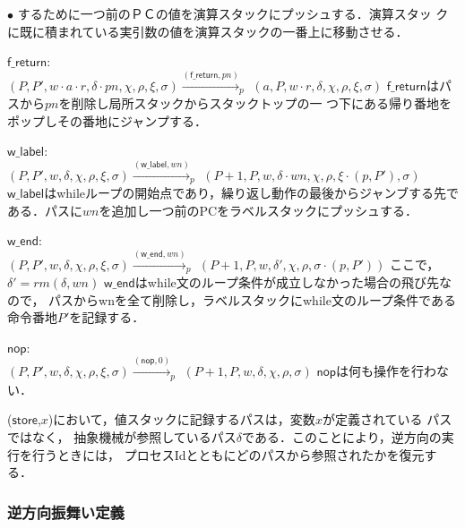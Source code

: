 \documentclass[submit,PRO]{ipsj}
\newcommand{\bcode}[1]{$\mathsf{#1}$}
\begin{document}
\begin{list}{$\bullet$}{}
      するために一つ前のＰＣの値を演算スタックにプッシュする．演算スタッ
      クに既に積まれている実引数の値を演算スタックの一番上に移動させる．
\item \bcode{f\_return}:\\
$(P,P',w\cdot a\cdot r,\delta\cdot pn,\chi,\rho,\xi,\sigma)\xrightarrow{(\mathsf{f\_return},pn)}_p$\newline
\qquad $(a,P,w\cdot r,\delta,\chi,\rho,\xi,\sigma)$\newline
\bcode{f\_return}はパスから$pn$を削除し局所スタックからスタックトップの一
      つ下にある帰り番地をポップしその番地にジャンプする．
\item \bcode{w\_label}:\\
$(P,P',w,\delta,\chi,\rho,\xi,\sigma)\xrightarrow{(\mathsf{w\_label},wn)}_p$\newline
\qquad $(P+1,P,w,\delta\cdot wn,\chi,\rho,\xi\cdot(p,P'),\sigma)$\newline
\bcode{w\_label}はwhileループの開始点であり，繰り返し動作の最後からジャンブする先である．パスに$wn$を追加し一つ前のPCをラベルスタックにプッシュする．
\item \bcode{w\_end}:\\
$(P,P',w,\delta,\chi,\rho,\xi,\sigma)\xrightarrow{(\mathsf{w\_end},wn)}_p$\newline
\qquad $(P+1,P,w,\delta',\chi,\rho,\sigma\cdot(p,P'))$\newline
ここで，$\delta'=rm(\delta,wn)$\newline
\bcode{w\_end}はwhile文のループ条件が成立しなかった場合の飛び先なので，
パスからwnを全て削除し，ラベルスタックにwhile文のループ条件である命令番地$P'$を記録する．
\item \bcode{nop}:\\
$(P,P',w,\delta,\chi,\rho,\xi,\sigma)\xrightarrow{(\mathsf{nop},0)}_p$\newline
\qquad $(P+1,P,w,\delta,\chi,\rho,\sigma)$\newline
\bcode{nop}は何も操作を行わない．
\end{list}

(\bcode{store},$x$)において，値スタックに記録するパスは，変数$x$が定義されている
パスではなく，
抽象機械が参照しているパス$\delta$である．このことにより，逆方向の実行を行うときには，
プロセスIdとともにどのパスから参照されたかを復元する．

\subsubsection{逆方向振舞い定義}
\end{document}
